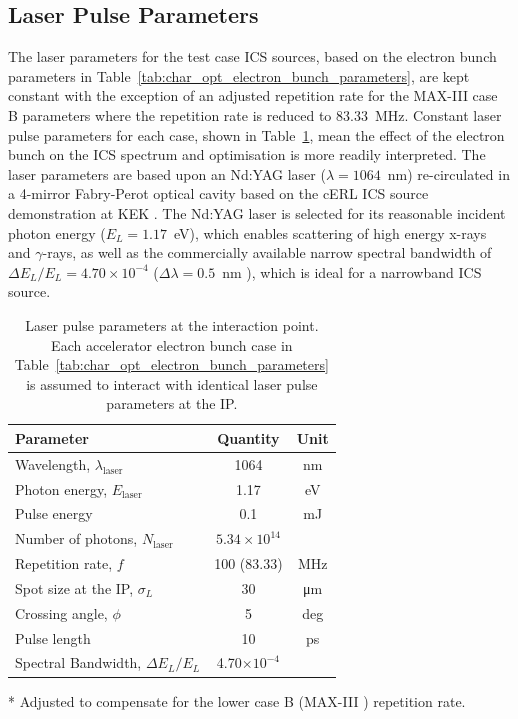 \documentclass[../main.tex]{subfiles}
\begin{document}
\subsection{Laser Pulse Parameters}
\label{sec:opt_char_laser}

The laser parameters for the test case ICS sources, based on the electron bunch parameters in Table~\ref{tab:char_opt_electron_bunch_parameters}, are kept constant with the exception of an adjusted repetition rate for the MAX-III case B parameters where the repetition rate is reduced to 83.33~\si{\mega\hertz}. Constant laser pulse parameters for each case, shown in Table~\ref{tab:char_opt_laser_pulse_parameters}, mean the effect of the electron bunch on the ICS spectrum and optimisation is more readily interpreted. The laser parameters are based upon an Nd:YAG laser ($\lambda = 1064$~\si{\nano\meter}) re-circulated in a 4-mirror Fabry-Perot optical cavity based on the cERL ICS source demonstration at KEK \cite{akagi2016narrow}. The Nd:YAG laser is selected for its reasonable incident photon energy ($E_{L}=1.17$~\si{\electronvolt}), which enables scattering of high energy x-rays and $\gamma$-rays, as well as the commercially available narrow spectral bandwidth of $\Delta E_{L}/E_{L} = 4.70\times 10^{-4}$  ($\Delta\lambda = 0.5$~\si{\nano\meter}  \cite{thorlabs2021ndyag200}), which is ideal for a narrowband ICS source.

\begin{table}[!h]
\centering
\caption{Laser pulse parameters at the interaction point. Each accelerator electron bunch case in Table~\ref{tab:char_opt_electron_bunch_parameters} is assumed to interact with identical laser pulse parameters at the IP.}
\vspace{3mm}
\begin{threeparttable}
\begin{tabular}{lcc}
\hline\hline
Parameter & Quantity & Unit \\
\hline
Wavelength, $\lambda_\textrm{laser}$ & 1064 & nm\\
Photon energy, $E_\textrm{laser}$ & 1.17 & eV\\
Pulse energy  & 0.1 & \si{\milli\joule}\\
Number of photons, $N_{\textrm{laser}}$ & $5.34\times 10^{14}$\\ 
Repetition rate, $f$ & 100 (83.33)\tnote{*} & MHz\\
Spot size at the IP, $\sigma_{L}$ & 30 & \si{\micro\meter}\\
Crossing angle, $\phi$ & 5 & deg \\
Pulse length  & 10 & ps\\
Spectral Bandwidth, $\Delta E_{L}/E_{L}$ & 4.70$\times 10^{-4}$ &   \\
\hline\hline
\end{tabular}
\begin{tablenotes}
\item[*]{Adjusted to compensate for the lower case B (MAX-III \cite{sjostrom2009max,rosborg2012electron}) repetition rate.}
\end{tablenotes}
\end{threeparttable}
\label{tab:char_opt_laser_pulse_parameters}
\end{table}
\end{document}
